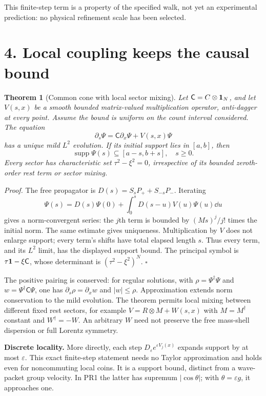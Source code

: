 \documentclass[11pt,a4paper]{article}
\newtheorem{theorem}{Theorem}\newtheorem{proposition}[theorem]{Proposition}
\begin{document}
This finite-step term is a property of the specified walk, not yet an experimental prediction: no physical refinement scale has been selected.

\newpage
\section*{4. Local coupling keeps the causal bound}
\begin{theorem}[Common cone with local sector mixing]
Let $\mathsf C=C\otimes\mathbf1_N$, and let $V(s,x)$ be a smooth bounded matrix-valued multiplication operator, anti-dagger at every point. Assume the bound is uniform on the count interval considered. The equation
\[
\partial_s\Psi=\mathsf C\partial_x\Psi+V(s,x)\Psi
\]
has a unique mild $L^2$ evolution. If its initial support lies in $[a,b]$, then
\[
\boxed{\operatorname{supp}\Psi(s)\subseteq[a-s,b+s],\quad s\geq0.}
\]
Every sector has characteristic set $\tau^2-\xi^2=0$, irrespective of its bounded zeroth-order rest term or sector mixing.
\end{theorem}
\textit{Proof.} The free propagator is $D(s)=S_sP_++S_{-s}P_-$. Iterating
\[
\Psi(s)=D(s)\Psi(0)+\int_0^s D(s-u)V(u)\Psi(u)\dd u
\]
gives a norm-convergent series: the $j$th term is bounded by $(Ms)^j/j!$ times the initial norm. The same estimate gives uniqueness. Multiplication by $V$ does not enlarge support; every term's shifts have total elapsed length $s$. Thus every term, and its $L^2$ limit, has the displayed support bound. The principal symbol is $\tau\mathbf1-\xi\mathsf C$, whose determinant is $(\tau^2-\xi^2)^N$. $\square$

The positive pairing is conserved: for regular solutions, with $\rho=\Psi^\dagger\Psi$ and $w=\Psi^\dagger\mathsf C\Psi$, one has $\partial_s\rho=\partial_xw$ and $|w|\leq\rho$. Approximation extends norm conservation to the mild evolution. The theorem permits local mixing between different fixed rest sectors, for example $V=R\otimes M+W(s,x)$ with $M=M^\dagger$ constant and $W^\dagger=-W$. An arbitrary $W$ need not preserve the free mass-shell dispersion or full Lorentz symmetry.

\textbf{Discrete locality.} More directly, each step $D_\varepsilon e^{\varepsilon V_j(x)}$ expands support by at most $\varepsilon$. This exact finite-step statement needs no Taylor approximation and holds even for noncommuting local coins. It is a support bound, distinct from a wave-packet group velocity. In PR1 the latter has supremum $|\cos\theta|$; with $\theta=\varepsilon g$, it approaches one.
\end{document}
